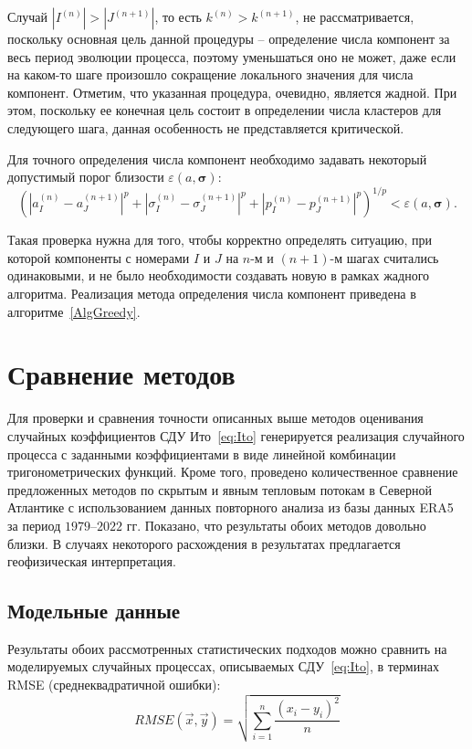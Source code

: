 Случай $\left|I^{(n)}\right|>\left|J^{(n+1)}\right|$, то есть $k^{(n)}>k^{(n+1)}$, не рассматривается, поскольку основная цель данной процедуры -- определение числа компонент за весь период эволюции процесса, поэтому уменьшаться оно не может, даже если на каком-то шаге произошло сокращение локального значения для числа компонент. Отметим, что указанная процедура, очевидно, является жадной. При этом, поскольку ее конечная цель состоит в определении числа кластеров для следующего шага, данная особенность не представляется критической.

Для точного определения числа компонент необходимо задавать некоторый допустимый порог близости $\varepsilon( a, {\boldsymbol \sigma})$:
\begin{equation}
	\label{Dist}
	\left(\left|a_I^{(n)}-a_J^{(n+1)}\right|^p+
	\left|\sigma_I^{(n)}-\sigma_J^{(n+1)}\right|^p +\left|p_I^{(n)}-p_J^{(n+1)}\right|^p\right)^{1/p} < \varepsilon({a}, {\boldsymbol \sigma}).
\end{equation}

Такая проверка нужна для того, чтобы корректно определять ситуацию, при которой компоненты с номерами $I$ и $J$ на $n$-м и $(n+1)$-м шагах считались одинаковыми, и не было необходимости создавать новую в рамках жадного алгоритма. Реализация метода определения числа компонент приведена в алгоритме~\ref{AlgGreedy}.


\section{Сравнение методов}
\label{sec:Compare}
Для проверки и сравнения точности описанных выше методов оценивания случайных коэффициентов СДУ Ито~\eqref{eq:Ito} генерируется реализация случайного процесса с заданными коэффициентами в виде линейной комбинации тригонометрических функций. Кроме того, проведено количественное сравнение предложенных методов по скрытым и явным тепловым потокам в Северной Атлантике с использованием данных повторного анализа из базы данных ERA5 за период $1979$--$2022$ гг. Показано, что результаты обоих методов довольно близки. В случаях некоторого расхождения в результатах предлагается геофизическая интерпретация.

\subsection{Модельные данные}
\label{sec:ModelData}
Результаты обоих рассмотренных статистических подходов можно сравнить на моделируемых случайных процессах, описываемых СДУ~\eqref{eq:Ito}, в терминах RMSE (среднеквадратичной ошибки):
$$
RMSE(\vec{x}, \vec{y}) = \sqrt{\sum\limits_{i=1}^n \frac{(x_i - y_i)^2}{n}}
$$

